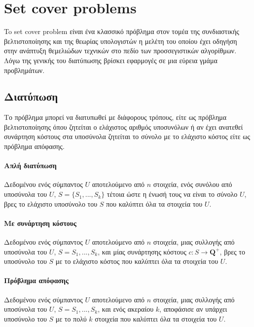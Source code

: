 
\chapter{Set cover problems} %

\label{Chapter1} %

To set cover problem είναι ένα κλασσικό πρόβλημα στον τομέα της συνδιαστικής βελτιστοποίησης και της θεωρίας υπολογιστών η μελέτη του οποίου έχει οδηγήση στην ανάπτυξη θεμελιώδων τεχνικών στο πεδίο των προσσεγιστικών αλγορίθμων. Λόγω της γενικής του διατύπωσης βρίσκει εφαρμογές σε μια εύρεια γμάμα προβλημάτων.

\section{Διατύπωση}
Το πρόβλημα μπορεί να διατυπωθεί με διάφορους τρόπους, είτε ως πρόβλημα βελτιστοποίησης όπου ζητείται ο ελάχιστος αριθμός υποσυνόλων ή αν έχει ανατεθεί συνάρτηση κόστους στα υποσύνολα ζητείται το σύνολο με το ελάχιστο κόστος είτε ως πρόβλημα απόφασης. 


\subsubsection{Απλή διατύπωση}
Δεδομένου ενός σύμπαντος $U$ αποτελούμενο από $n$ στοιχεία, ενός συνόλου από υποσύνολα του $U$, $S = \{S_1,...,S_k\}$ τέτοια ώστε η ένωσή τους να είναι το σύνολο $U$, βρες το ελάχιστο υποσύνολο του $S$ που καλύπτει όλα τα στοιχεία του $U$.

\subsubsection{Με συνάρτηση κόστους}
Δεδομένου ενός σύμπαντος $U$ αποτελούμενο από $n$ στοιχεία, μιας συλλογής από υποσύνολα του $U$, $S = {S_1,...,S_k}$, και μίας συνάρτησης κόστους $c : S \rightarrow {\boldsymbol{Q}^+}$, βρες το υποσύνολο του $S$ με το ελάχιστο κόστος που καλύπτει όλα τα στοιχεία του $U$.

\subsubsection{Πρόβλημα απόφασης}
Δεδομένου ενός σύμπαντος $U$ αποτελούμενο από $n$ στοιχεία, μιας συλλογής από υποσύνολα του $U$, $S = {S_1,...,S_k}$, και ενός ακεραίου $k$, αποφάσισε αν υπάρχει υποσύνολο του $S$ με το πολύ $k$ στοιχεία που καλύπτει όλα τα στοιχεία του $U$.

